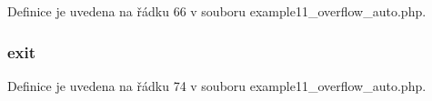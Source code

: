 Definice je uvedena na řádku 66 v souboru example11\-\_\-overflow\-\_\-auto.\-php.

\hypertarget{example11__overflow__auto_8php_a6733eb5f605d09eaede9845835d71c4e}{
\subsubsection[{exit}]{\setlength{\rightskip}{0pt plus 5cm}exit}}\label{example11__overflow__auto_8php_a6733eb5f605d09eaede9845835d71c4e}


Definice je uvedena na řádku 74 v souboru example11\-\_\-overflow\-\_\-auto.\-php.

